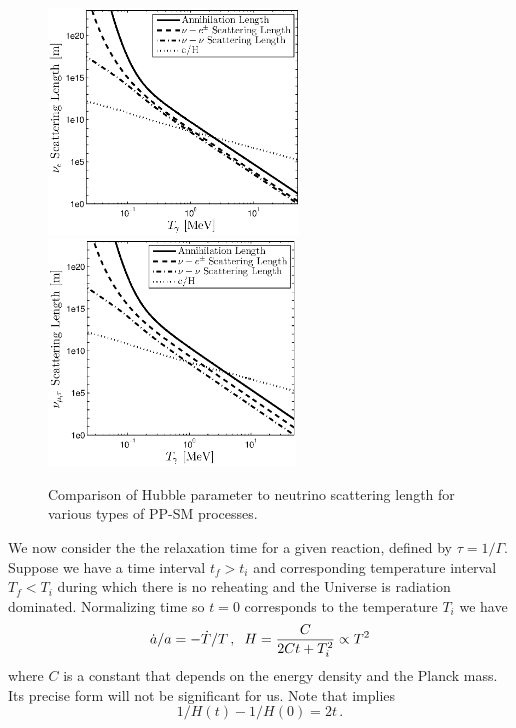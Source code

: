 \begin{figure} 
\centerline{\includegraphics[height=6cm]{04-birrell/ParametricStudies/Figures/nu_e_scattering_length_eta_0_23.eps}\includegraphics[height=6cm]{04-birrell/ParametricStudies/Figures/nu_mu_scattering_length_eta_0_23.eps}}
\caption{Comparison of Hubble parameter to neutrino scattering length for various types of PP-SM processes.   }\label{fig:scatt_length}
\end{figure}


We now consider the the relaxation time for a given reaction, defined by $\tau=1/\Gamma$.  Suppose we have a time interval $t_f>t_i$  and corresponding temperature interval $T_f<T_i$ during which there is no reheating and the Universe is radiation dominated.  Normalizing time so $t=0$ corresponds to the temperature $T_i$ we have
\begin{equation}\label{ch6:H_eq}
\dot a/a=-\dot T/T\,,\hspace{2mm} H=\frac{C}{2Ct+T_i^2}\propto T^2
\end{equation}
where $C$ is a constant that depends on the energy density and the Planck mass.  Its precise form will not be significant for us.  Note that  implies
\begin{equation}
1/H(t)-1/H(0)=2t\,.
\end{equation}


